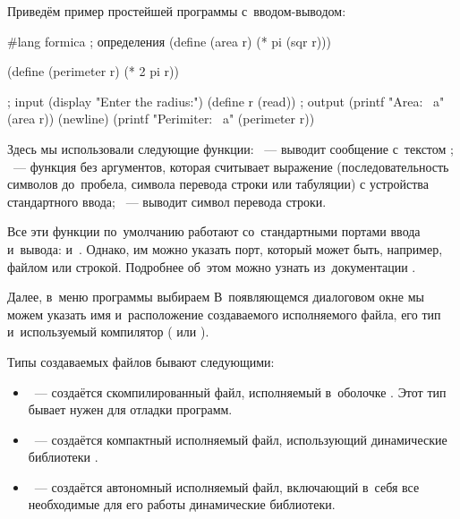 Приведём пример простейшей программы с~вводом-выводом:
\begin{Definition}[emph={r}]
#lang formica
; определения
(define (area r) (* pi (sqr r)))

(define (perimeter r) (* 2 pi r))

; input
(display "Enter the radius:")
(define r (read))
; output
(printf "Area: ~a" (area r))
(newline)
(printf "Perimiter: ~a" (perimeter r))
\end{Definition}


Здесь мы использовали следующие функции: ~--- выводит сообщение с~текстом ; ~--- функция без аргументов, которая считывает выражение (последовательность символов до~пробела, символа перевода строки или табуляции) с устройства стандартного ввода; ~--- выводит символ перевода строки.

Все эти функции по~умолчанию работают со~стандартными портами ввода и~вывода:  и~. Однако, им можно указать порт, который может быть, например, файлом или строкой. Подробнее об~этом можно узнать из~документации .

Далее, в~меню программы  выбираем  В~появляющемся диалоговом окне мы можем указать имя и~расположение создаваемого исполняемого файла, его тип и~используемый компилятор ( или ).

Типы создаваемых файлов бывают следующими:

\begin{itemize}[--]
 \item {}~--- создаётся скомпилированный файл, исполняемый в~оболочке . Этот тип бывает нужен для отладки программ.

 \item {}~--- создаётся компактный исполняемый файл, использующий динамические библиотеки .

 \item {}~--- создаётся автономный исполняемый файл, включающий в~себя все необходимые для его работы динамические библиотеки.
\end{itemize}

